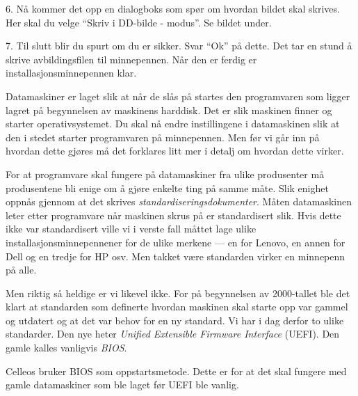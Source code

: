 \item{6.} N\aa{} kommer det opp en dialogboks som sp\o r om hvordan bildet skal skrives. Her skal du velge ``Skriv i DD-bilde - modus''. Se bildet under.
\vskip 1.5pc
\vskip 1.5pc
\item{7.} Til slutt blir du spurt om du er sikker. Svar ``Ok'' p\aa{} dette. Det tar en stund \aa{} skrive avbildingsfilen til minnepennen. N\aa r den er ferdig er installasjons\-minnepennen klar.


Datamaskiner er laget slik at n\aa r de sl\aa s p\aa{} startes den programvaren som ligger lagret p\aa{} begynnelsen av maskinens harddisk. Det er slik maskinen finner og starter operativsystemet. Du skal n\aa{} endre instillingene i datamaskinen slik at den i stedet starter programvaren p\aa{} minnepennen. Men f\o r vi g\aa r inn p\aa{} hvordan dette gj\o res m\aa{} det forklares litt mer i detalj om hvordan dette virker.

For at programvare skal fungere p\aa{} datamaskiner fra ulike produsenter m\aa{} produsentene bli enige om  \aa{} gj\o re enkelte ting p\aa{} samme m\aa te. Slik enighet oppn\aa s gjennom at det skrives {\it standardiseringsdokumenter}. M\aa ten datamaskinen leter etter programvare n\aa r maskinen skrus p\aa{} er standardisert slik. Hvis dette ikke var standardisert ville vi i verste fall m\aa ttet lage ulike installasjonsminnepennener for de ulike merkene --- en for Lenovo, en annen for Dell og  en tredje for HP osv. Men takket v\ae re standarden virker en minnepenn p\aa{} alle.

Men riktig s\aa{} heldige er vi likevel ikke. For p\aa{} begynnelsen av 2000-tallet ble det klart at standarden som definerte hvordan maskinen skal starte opp var gammel og utdatert og at det var behov for en ny standard. Vi har i dag derfor to ulike standarder. Den nye heter {\it Unified Extensible Firmware Interface} (UEFI). Den gamle kalles vanligvis {\it BIOS}. 

Celleos bruker BIOS som oppstartsmetode. Dette er for at det skal fungere med gamle datamaskiner som ble laget f\o r UEFI ble vanlig. 


